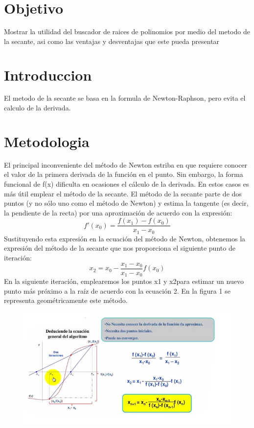\documentclass{article}
\begin{document}
\begin{multicols}{2}

\section{Objetivo}
\label{sec:obj}
  Mostrar la utilidad del buscador de raices de polinomios por medio del metodo de la secante, asi como las ventajas y desventajas que este pueda presentar

\section{Introduccion}
\label{sec:Intro}
El metodo de la secante se basa en la formula de Newton-Raphson, pero evita el calculo de la derivada.

\section{Metodologia}
\label{sec:Met}
El principal inconveniente del método de Newton estriba en que requiere conocer el valor de la primera derivada de la función en el punto. Sin embargo, la forma funcional de f(x) dificulta en ocasiones el cálculo de la derivada. En estos casos es más útil emplear el método de la secante.
El método de la secante parte de dos puntos (y no sólo uno como el método de Newton) y estima la tangente (es decir, la pendiente de la recta) por una aproximación de acuerdo con la expresión:
\begin{equation}
f'(x_{0})=\frac{f(x_{1})-f(x_{0})}{x_{1}-x_{0}}
\end{equation}
Sustituyendo esta expresión en la ecuación del método de Newton, obtenemos la expresión del método de la secante que nos proporciona el siguiente punto de iteración:
\begin{equation}
x_{2}=x_{0}-\frac{x_{1}-x_{0}}{x_{1}-x_{0}} f(x_{0})
\end{equation}
En la siguiente iteración, emplearemos los puntos x1 y x2para estimar un nuevo punto más próximo a la raíz de acuerdo con la ecuación 2. En la figura 1 se representa geométricamente este método.
\begin{figure}[H]
\centering
\includegraphics[scale=.375]{Secante.jpg}

\end{figure}
\end{multicols}
\end{document}
